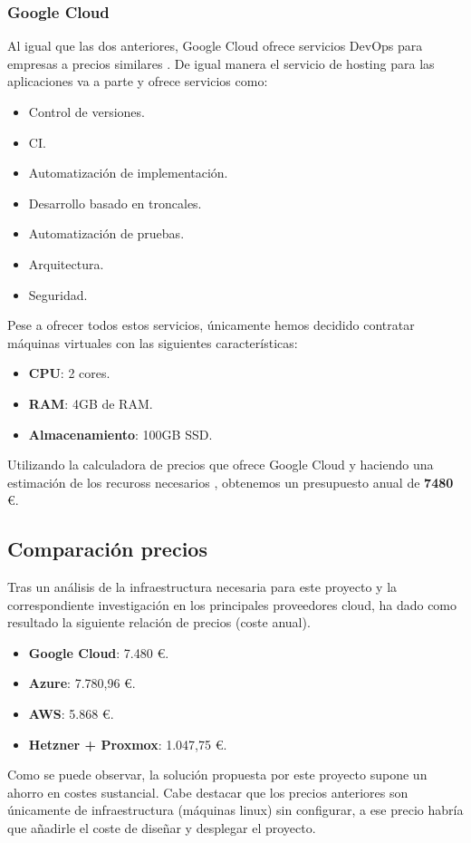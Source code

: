 		\subsubsection{Google Cloud}
			\begin{text}
				Al igual que las dos anteriores, Google Cloud ofrece servicios DevOps para empresas a precios similares \cite{GoogleCloud:online}. De igual manera el servicio de hosting para las aplicaciones va a parte y ofrece servicios como:
				\begin{itemize}
					\item Control de versiones.
					\item CI.
					\item Automatización de implementación.
					\item Desarrollo basado en troncales.
					\item Automatización de pruebas.
					\item Arquitectura.
					\item Seguridad.
				\end{itemize}
			
			Pese a ofrecer todos estos servicios, únicamente hemos decidido contratar máquinas virtuales con las siguientes características:
			
			\begin{itemize}
				\item \textbf{CPU}: 2 cores.
				\item \textbf{RAM}: 4GB de RAM.
				\item \textbf{Almacenamiento}: 100GB SSD.
			\end{itemize}
			
			Utilizando la calculadora de precios que ofrece Google Cloud \cite{googlecloudcalculadora:online} y haciendo una estimación de los recuross necesarios , obtenemos un presupuesto anual de \textbf{7480} \euro.
			\end{text}
		
		\subsection{Comparación precios}
		\label{comparacion_precios}
			\begin{text}
				Tras un análisis de la infraestructura necesaria para este proyecto y la correspondiente investigación en los principales proveedores cloud, ha dado como resultado la siguiente relación de precios (coste anual).
				\begin{itemize}
					\item \textbf{Google Cloud}: 7.480 \euro.
					\item \textbf{Azure}: 7.780,96 \euro.
					\item \textbf{AWS}: 5.868 \euro.
					\item \textbf{Hetzner + Proxmox}: 1.047,75 \euro.
				\end{itemize}	
			Como se puede observar, la solución propuesta por este proyecto supone un ahorro en costes sustancial. Cabe destacar que los precios anteriores son únicamente de infraestructura (máquinas linux) sin configurar, a ese precio habría que añadirle el coste de diseñar y desplegar el proyecto.
			\end{text}
		
